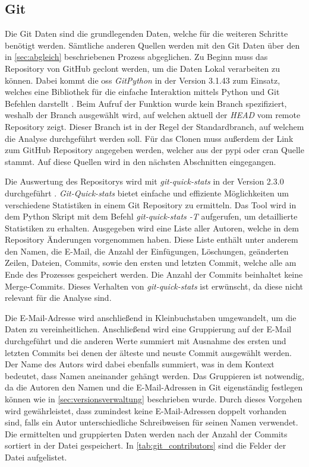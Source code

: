 \subsection{Git}
\label{subsec:datenbeschaffung_git}
Die Git Daten sind die grundlegenden Daten, welche für die weiteren Schritte benötigt werden.
Sämtliche anderen Quellen werden mit den Git Daten über den in \autoref{sec:abgleich} beschriebenen Prozess abgeglichen.
Zu Beginn muss das Repository von GitHub geclont werden, um die Daten Lokal verarbeiten zu können.
Dabei kommt die \gls{oss} \emph{GitPython} in der Version 3.1.43 zum Einsatz, welches eine Bibliothek für die einfache Interaktion mittels Python und Git Befehlen darstellt \autocite{thiel_gitpython-developersgitpython_2024}.
Beim Aufruf der Funktion wurde kein Branch spezifiziert, weshalb der Branch ausgewählt wird, auf welchen aktuell der \emph{HEAD} vom remote Repository zeigt.
Dieser Branch ist in der Regel der Standardbranch, auf welchem die Analyse durchgeführt werden soll.
Für das Clonen muss außerdem der Link zum GitHub Repository angegeben werden, welcher aus der \gls{pypi} oder \gls{cran} Quelle stammt.
Auf diese Quellen wird in den nächsten Abschnitten eingegangen.

Die Auswertung des Repositorys wird mit \emph{git-quick-stats} in der Version 2.3.0 durchgeführt \autocite{arzzen_git-quick-statsgit-quick-stats_2021}.
\emph{Git-Quick-stats} bietet einfache und effiziente Möglichkeiten um verschiedene Statistiken in einem Git Repository zu ermitteln.
Das Tool wird in dem Python Skript mit dem Befehl \emph{git-quick-stats -T} aufgerufen, um detaillierte Statistiken zu erhalten.
Ausgegeben wird eine Liste aller Autoren, welche in dem Repository Änderungen vorgenommen haben.
Diese Liste enthält unter anderem den Namen, die E-Mail, die Anzahl der Einfügungen, Löschungen, geänderten Zeilen, Dateien, Commits, sowie den ersten und letzten Commit, welche alle am Ende des Prozesses gespeichert werden.
Die Anzahl der Commits beinhaltet keine Merge-Commits.
Dieses Verhalten von \emph{git-quick-stats} ist erwünscht, da diese nicht relevant für die Analyse sind.

Die E-Mail-Adresse wird anschließend in Kleinbuchstaben umgewandelt, um die Daten zu vereinheitlichen.
Anschließend wird eine Gruppierung auf der E-Mail durchgeführt und die anderen Werte summiert mit Ausnahme des ersten und letzten Commits bei denen der älteste und neuste Commit ausgewählt werden.
Der Name des Autors wird dabei ebenfalls summiert, was in dem Kontext bedeutet, dass Namen aneinander gehängt werden.
Das Gruppieren ist notwendig, da die Autoren den Namen und die E-Mail-Adressen in Git eigenständig festlegen können wie in \autoref{sec:versionsverwaltung} beschrieben wurde.
Durch dieses Vorgehen wird gewährleistet, dass zumindest keine E-Mail-Adressen doppelt vorhanden sind, falls ein Autor unterschiedliche Schreibweisen für seinen Namen verwendet.
Die ermittelten und gruppierten Daten werden nach der Anzahl der Commits sortiert in der Datei  gespeichert.
In \autoref{tab:git_contributors} sind die Felder der Datei aufgelistet.

